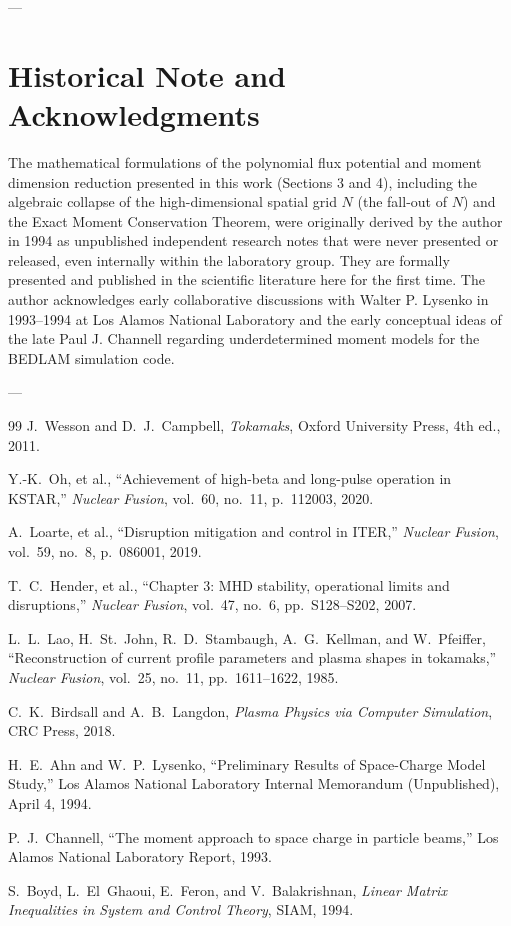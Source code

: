 \documentclass[11pt,a4paper]{article}
\begin{document}
---

\section*{Historical Note and Acknowledgments}
The mathematical formulations of the polynomial flux potential and moment dimension reduction presented in this work (Sections 3 and 4), including the algebraic collapse of the high-dimensional spatial grid $N$ (the fall-out of $N$) and the Exact Moment Conservation Theorem, were originally derived by the author in 1994 as unpublished independent research notes that were never presented or released, even internally within the laboratory group. They are formally presented and published in the scientific literature here for the first time. The author acknowledges early collaborative discussions with Walter P. Lysenko in 1993--1994 at Los Alamos National Laboratory and the early conceptual ideas of the late Paul J. Channell regarding underdetermined moment models for the BEDLAM simulation code.

---

\begin{thebibliography}{99}
J.~Wesson and D.~J.~Campbell, \emph{Tokamaks}, Oxford University Press, 4th ed., 2011.

Y.-K.~Oh, et al., ``Achievement of high-beta and long-pulse operation in KSTAR,'' \emph{Nuclear Fusion}, vol.~60, no.~11, p.~112003, 2020.

A.~Loarte, et al., ``Disruption mitigation and control in ITER,'' \emph{Nuclear Fusion}, vol.~59, no.~8, p.~086001, 2019.

T.~C.~Hender, et al., ``Chapter 3: MHD stability, operational limits and disruptions,'' \emph{Nuclear Fusion}, vol.~47, no.~6, pp.~S128--S202, 2007.

L.~L.~Lao, H.~St.~John, R.~D.~Stambaugh, A.~G.~Kellman, and W.~Pfeiffer, ``Reconstruction of current profile parameters and plasma shapes in tokamaks,'' \emph{Nuclear Fusion}, vol.~25, no.~11, pp.~1611--1622, 1985.

C.~K.~Birdsall and A.~B.~Langdon, \emph{Plasma Physics via Computer Simulation}, CRC Press, 2018.

H.~E.~Ahn and W.~P.~Lysenko, ``Preliminary Results of Space-Charge Model Study,'' Los Alamos National Laboratory Internal Memorandum (Unpublished), April 4, 1994.

P.~J.~Channell, ``The moment approach to space charge in particle beams,'' Los Alamos National Laboratory Report, 1993.

S.~Boyd, L.~El~Ghaoui, E.~Feron, and V.~Balakrishnan, \emph{Linear Matrix Inequalities in System and Control Theory}, SIAM, 1994.
\end{thebibliography}
\end{document}

